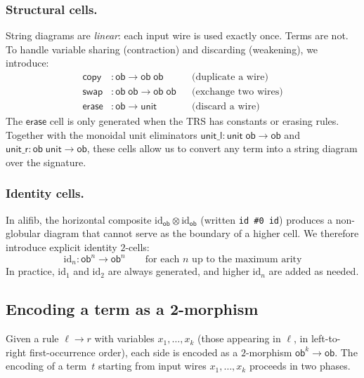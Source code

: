 \documentclass[acmsmall,screen,nonacm]{acmart}
\newcommand{\ob}{\mathsf{ob}}
\newcommand{\unit}{\mathsf{unit}}
\newcommand{\id}{\mathrm{id}}
\newcommand{\copy}{\mathsf{copy}}
\newcommand{\swap}{\mathsf{swap}}
\newcommand{\erase}{\mathsf{erase}}
\newcommand{\alifib}{\textsf{alifib}}
\begin{document}
\subsubsection{Structural cells.}
String diagrams are \emph{linear}: each input wire is used exactly
once.  Terms are not.  To handle variable sharing (contraction) and
discarding (weakening), we introduce:
\begin{align*}
  \copy  &: \ob \to \ob\;\ob  & &\text{(duplicate a wire)} \\
  \swap  &: \ob\;\ob \to \ob\;\ob & &\text{(exchange two wires)} \\
  \erase &: \ob \to \unit     & &\text{(discard a wire)}
\end{align*}
The $\erase$ cell is only generated when the TRS has constants or
erasing rules.  Together with the monoidal unit eliminators
$\mathsf{unit\_l} : \unit\;\ob \to \ob$ and
$\mathsf{unit\_r} : \ob\;\unit \to \ob$, these cells allow us to
convert any term into a string diagram over the signature.

\subsubsection{Identity cells.}
In \alifib, the horizontal composite $\id_\ob \otimes \id_\ob$
(written \texttt{id \#0 id}) produces a non-globular diagram that
cannot serve as the boundary of a higher cell.  We therefore introduce
explicit identity $2$-cells:
\[
  \id_n : \ob^n \to \ob^n
  \qquad\text{for each $n$ up to the maximum arity}
\]
In practice, $\id_1$ and $\id_2$ are always generated, and higher
$\id_n$ are added as needed.

\subsection{Encoding a term as a 2-morphism}
\label{sec:term-encoding}

Given a rule $\ell \to r$ with variables $x_1, \ldots, x_k$ (those
appearing in $\ell$, in left-to-right first-occurrence order), each
side is encoded as a $2$-morphism $\ob^k \to \ob$.  The encoding of a
term~$t$ starting from input wires $x_1, \ldots, x_k$ proceeds in two
phases.
\end{document}
